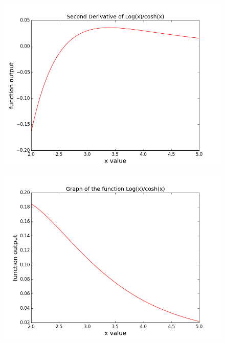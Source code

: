 \documentclass[11pt]{article}
\begin{document}
\begin{figure}[ht]
\centering
\includegraphics[scale=.4]{second_derivative.png}
\end{figure}

\begin{figure}[ht]
\centering
\includegraphics[scale=.4]{function.png}
\end{figure}
\end{document}

